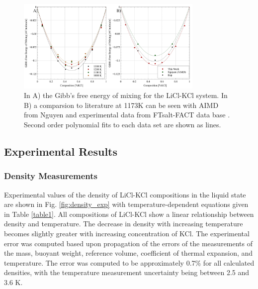 \documentclass[review]{elsarticle}
\begin{document}
\begin{figure}[h]
 \centering
 \includegraphics[width=0.8\textwidth]{images/gibbs_mixxing_combined.jpg} 
 \caption{In A) the Gibb's free energy of mixing for the LiCl-KCl system. In B) a comparsion to literature at 1173K can be seen with AIMD from Nguyen \cite{NGUYEN2021} and experimental data from FTsalt-FACT data base \cite{FTsalt}. Second order polynomial fits to each data set are shown as lines.}
 \label{fig:gibb}
\end{figure} 

\FloatBarrier

\subsection{Experimental Results}

\subsubsection{Density Measurements}

Experimental values of the density of LiCl-KCl compositions in the liquid state are shown in Fig. \ref{fig:density_exp} with temperature-dependent equations given in Table \ref{table1}. All compositions of LiCl-KCl show a linear relationship between density and temperature. The decrease in density with increasing temperature becomes slightly greater with increasing concentration of KCl. The experimental error was computed based upon propagation of the errors of the measurements of the mass, buoyant weight, reference volume, coefficient of thermal expansion, and temperature. The error was computed to be approximately 0.7\% for all calculated densities, with the temperature measurement uncertainty being between 2.5 and 3.6 K. 
\end{document}

